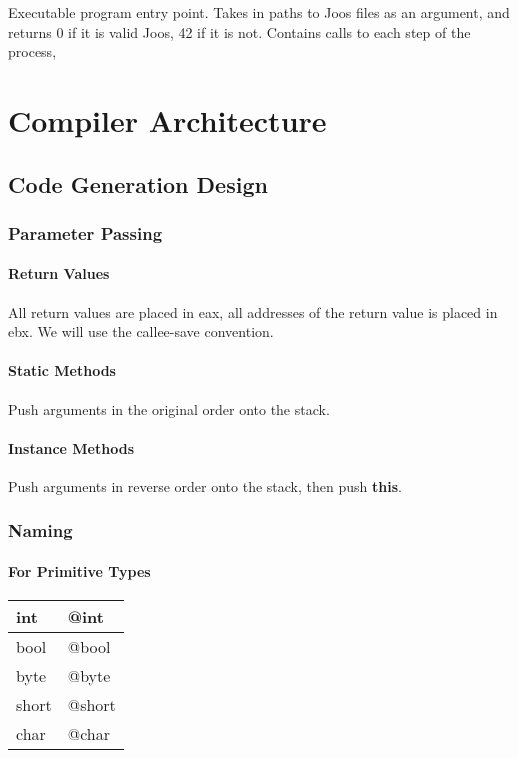 \documentclass[12pt, a4paper]{article}
\newcommand{\class}{\textbf}
\begin{document}
Executable program entry point. Takes in paths to Joos files as an argument, and returns 0 if it is valid Joos, 42 if it is not. Contains calls to each step of the process, 

\section{Compiler Architecture}

\subsection{Code Generation Design}
\subsubsection{Parameter Passing}

\paragraph{Return Values}
All return values are placed in eax, all addresses of the return value is placed in ebx. We will use the callee-save convention.

\paragraph{Static Methods}
Push arguments in the original order onto the stack.

\paragraph{Instance Methods}
Push arguments in reverse order onto the stack, then push \class{this}.

\subsubsection{Naming}

\paragraph{For Primitive Types}
\begin{center}
\begin{tabular}{|l|l|}
\hline
   int & @int \\ \hline
   bool & @bool \\ \hline
   byte & @byte \\ \hline
   short & @short \\ \hline
   char & @char \\ \hline
\end{tabular}
\end{center}
\end{document}
